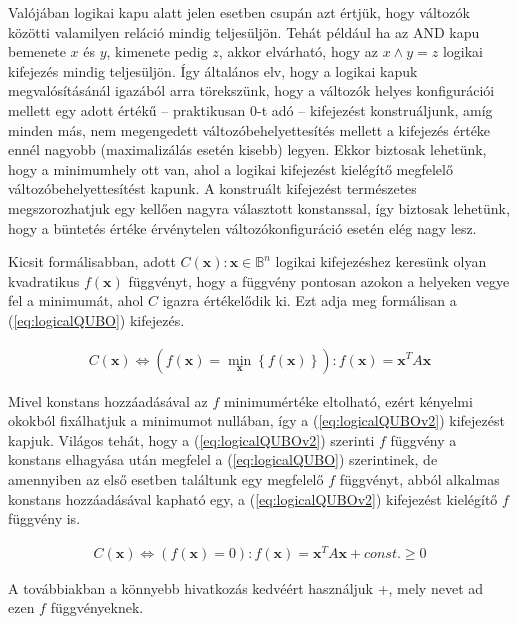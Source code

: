 Valójában logikai kapu alatt jelen esetben csupán azt értjük, hogy változók közötti valamilyen reláció mindig teljesüljön. Tehát például ha az AND kapu bemenete $x$ és $y$, kimenete pedig $z$, akkor elvárható, hogy az $x \wedge y = z$ logikai kifejezés mindig teljesüljön. Így általános elv, hogy a logikai kapuk megvalósításánál igazából arra törekszünk, hogy a változók helyes konfigurációi mellett egy adott értékű -- praktikusan 0-t adó -- kifejezést konstruáljunk, amíg minden más, nem megengedett változóbehelyettesítés mellett a kifejezés értéke ennél nagyobb (maximalizálás esetén kisebb) legyen. Ekkor biztosak lehetünk, hogy a minimumhely ott van, ahol a logikai kifejezést kielégítő megfelelő változóbehelyettesítést kapunk. A konstruált kifejezést természetes megszorozhatjuk egy kellően nagyra választott konstanssal, így biztosak lehetünk, hogy a büntetés értéke érvénytelen változókonfiguráció esetén elég nagy lesz.

Kicsit formálisabban, adott $C(\mathbf{x}) : \mathbf{x} \in \mathbb{B}^n$ logikai kifejezéshez keresünk olyan kvadratikus $f(\mathbf{x})$ függvényt, hogy a függvény pontosan azokon a helyeken vegye fel a minimumát, ahol $C$ igazra értékelődik ki. Ezt adja meg formálisan a (\ref{eq:logicalQUBO}) kifejezés.

\begin{align} \label{eq:logicalQUBO}
	C(\mathbf{x}) \Leftrightarrow  (f(\mathbf{x}) = \min_{\mathbf{x}} \left\{ f(\mathbf{x}) \right\})
	: f(\mathbf{x})=\mathbf{x}^T A \mathbf{x}
\end{align}

Mivel konstans hozzáadásával az $f$ minimumértéke eltolható, ezért kényelmi okokból fixálhatjuk a minimumot nullában, így  a (\ref{eq:logicalQUBOv2}) kifejezést kapjuk. Világos tehát, hogy a (\ref{eq:logicalQUBOv2}) szerinti $f$ függvény a konstans elhagyása után megfelel a (\ref{eq:logicalQUBO}) szerintinek, de amennyiben az első esetben találtunk egy megfelelő $f$ függvényt, abból alkalmas konstans hozzáadásával kapható egy, a (\ref{eq:logicalQUBOv2}) kifejezést kielégítő $f$ függvény is.

\begin{align} \label{eq:logicalQUBOv2}
	C(\mathbf{x}) \Leftrightarrow  ( f(\mathbf{x})=0 )
	: f(\mathbf{x})=\mathbf{x}^T A \mathbf{x} + const. \geq 0
\end{align}

A továbbiakban a könnyebb hivatkozás kedvéért használjuk \az+, mely nevet ad ezen $f$ függvényeknek.

